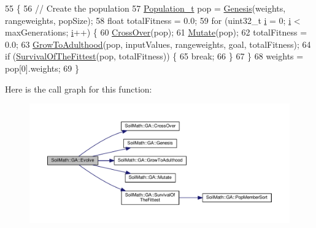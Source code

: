 \begin{DoxyCode}
55                                                            \{
56   \textcolor{comment}{// Create the population}
57   \hyperlink{_soil_math_types_8h_a8d2d4c736cf817d048a2d66dec8b12ec}{Population\_t} pop = \hyperlink{class_soil_math_1_1_g_a_a96cfe7cc5b3028a66b0136e72ea38cbc}{Genesis}(weights, rangeweights, popSize);
58   \textcolor{keywordtype}{float} totalFitness = 0.0;
59   \textcolor{keywordflow}{for} (uint32\_t \hyperlink{_comparision_pictures_2_createtest_image_8m_a6f6ccfcf58b31cb6412107d9d5281426}{i} = 0; \hyperlink{_comparision_pictures_2_createtest_image_8m_a6f6ccfcf58b31cb6412107d9d5281426}{i} < maxGenerations; \hyperlink{_comparision_pictures_2_createtest_image_8m_a6f6ccfcf58b31cb6412107d9d5281426}{i}++) \{
60     \hyperlink{class_soil_math_1_1_g_a_abf408d603b2afb188a6d265eb6309b69}{CrossOver}(pop);
61     \hyperlink{class_soil_math_1_1_g_a_a489f2afd54086c14f45b654aeec0fe3c}{Mutate}(pop);
62     totalFitness = 0.0;
63     \hyperlink{class_soil_math_1_1_g_a_aff791f50f889beb74e854942f8883b58}{GrowToAdulthood}(pop, inputValues, rangeweights, goal, totalFitness);
64     \textcolor{keywordflow}{if} (\hyperlink{class_soil_math_1_1_g_a_ac2c10631815408d044738f678c67e98b}{SurvivalOfTheFittest}(pop, totalFitness)) \{
65       \textcolor{keywordflow}{break};
66     \}
67   \}
68   weights = pop[0].weights;
69 \}
\end{DoxyCode}


Here is the call graph for this function\+:
\nopagebreak
\begin{figure}[H]
\begin{center}
\leavevmode
\includegraphics[width=350pt]{class_soil_math_1_1_g_a_aca448f36c1f98b4906d0754cf354cccf_cgraph}
\end{center}
\end{figure}


\hypertarget{class_soil_math_1_1_g_a_a96cfe7cc5b3028a66b0136e72ea38cbc}{}
